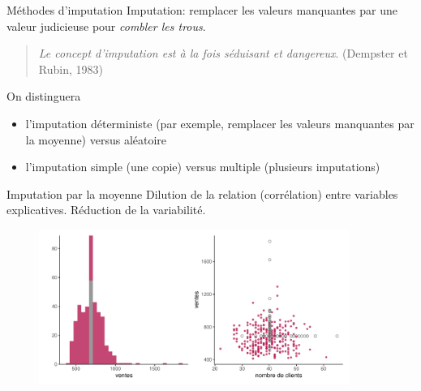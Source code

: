 \documentclass[
  ignorenonframetext,
]{beamer}
\providecommand{\tightlist}{%
  \setlength{\itemsep}{0pt}\setlength{\parskip}{0pt}}\usepackage{longtable,booktabs,array}
\begin{document}
\begin{frame}{Méthodes d'imputation}
\protect\hypertarget{muxe9thodes-dimputation}{}
Imputation: remplacer les valeurs manquantes par une valeur judicieuse
pour \emph{combler les trous}.

\begin{quote}
\emph{Le concept d'imputation est à la fois séduisant et dangereux}.
(Dempster et Rubin, 1983)
\end{quote}

On distinguera

\begin{itemize}
\tightlist
\item
  l'imputation déterministe (par exemple, remplacer les valeurs
  manquantes par la moyenne) versus aléatoire
\item
  l'imputation simple (une copie) versus multiple (plusieurs
  imputations)
\end{itemize}
\end{frame}

\begin{frame}{Imputation par la moyenne}
\protect\hypertarget{imputation-par-la-moyenne}{}
Dilution de la relation (corrélation) entre variables explicatives.
Réduction de la variabilité.

\begin{figure}

{\centering \includegraphics[width=0.9\textwidth,height=\textheight]{MATH60602-diapos7_files/figure-beamer/unnamed-chunk-2-1.pdf}

}

\end{figure}
\end{frame}
\end{document}

